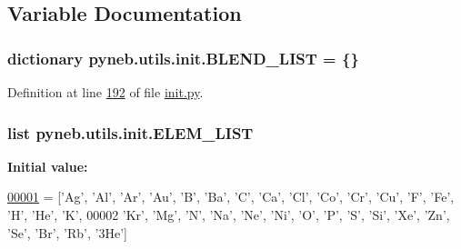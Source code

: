 \subsection{Variable Documentation}
\hypertarget{namespacepyneb_1_1utils_1_1init_a88fe95af75ee9a6faed10cc8a74bac2e}{}
\subsubsection[{B\+L\+E\+N\+D\+\_\+\+L\+I\+S\+T}]{\setlength{\rightskip}{0pt plus 5cm}dictionary pyneb.\+utils.\+init.\+B\+L\+E\+N\+D\+\_\+\+L\+I\+S\+T = \{\}}\label{namespacepyneb_1_1utils_1_1init_a88fe95af75ee9a6faed10cc8a74bac2e}


Definition at line \hyperlink{init_8py_source_l00192}{192} of file \hyperlink{init_8py_source}{init.\+py}.

\hypertarget{namespacepyneb_1_1utils_1_1init_a3c09818249d1b1194ea51949b934e232}{}
\subsubsection[{E\+L\+E\+M\+\_\+\+L\+I\+S\+T}]{\setlength{\rightskip}{0pt plus 5cm}list pyneb.\+utils.\+init.\+E\+L\+E\+M\+\_\+\+L\+I\+S\+T}\label{namespacepyneb_1_1utils_1_1init_a3c09818249d1b1194ea51949b934e232}
{\bfseries Initial value\+:}
\begin{DoxyCode}
\hypertarget{namespacepyneb_1_1utils_1_1init_l00001}{}\hyperlink{namespacepyneb_1_1utils_1_1init}{00001} = [\textcolor{stringliteral}{'Ag'}, \textcolor{stringliteral}{'Al'}, \textcolor{stringliteral}{'Ar'}, \textcolor{stringliteral}{'Au'}, \textcolor{stringliteral}{'B'}, \textcolor{stringliteral}{'Ba'}, \textcolor{stringliteral}{'C'}, \textcolor{stringliteral}{'Ca'}, \textcolor{stringliteral}{'Cl'}, \textcolor{stringliteral}{'Co'}, \textcolor{stringliteral}{'Cr'}, \textcolor{stringliteral}{'Cu'}, \textcolor{stringliteral}{'F'}, \textcolor{stringliteral}{'Fe'}, \textcolor{stringliteral}{'H'}, \textcolor{stringliteral}{'He'}, \textcolor{stringliteral}{'K'},
00002              \textcolor{stringliteral}{'Kr'}, \textcolor{stringliteral}{'Mg'}, \textcolor{stringliteral}{'N'}, \textcolor{stringliteral}{'Na'}, \textcolor{stringliteral}{'Ne'}, \textcolor{stringliteral}{'Ni'}, \textcolor{stringliteral}{'O'}, \textcolor{stringliteral}{'P'}, \textcolor{stringliteral}{'S'}, \textcolor{stringliteral}{'Si'}, \textcolor{stringliteral}{'Xe'}, \textcolor{stringliteral}{'Zn'}, \textcolor{stringliteral}{'Se'}, \textcolor{stringliteral}{'Br'}, \textcolor{stringliteral}{'Rb'}, \textcolor{stringliteral}{'3He'}]
\end{DoxyCode}


